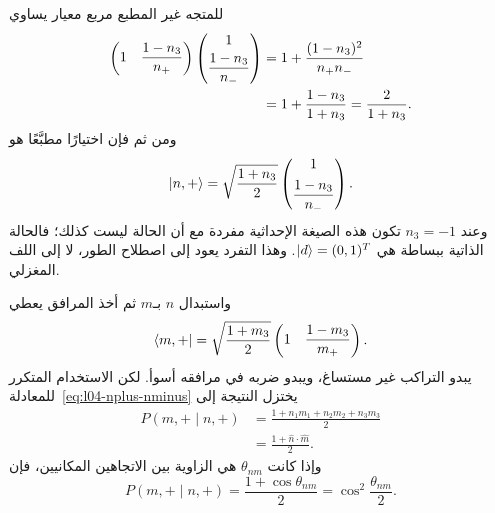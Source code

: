للمتجه غير المطبع مربع معيار يساوي
\begin{align}
  \begin{pmatrix}
    1&\dfrac{1-n_3}{n_+}
  \end{pmatrix}
  \begin{pmatrix}
    1\\[3pt]\dfrac{1-n_3}{n_-}
  \end{pmatrix}
  &=
  1+\frac{(1-n_3)^2}{n_+n_-}
  \notag\\
  &=
  1+\frac{1-n_3}{1+n_3}
  =
  \frac{2}{1+n_3}.
  \label{eq:l04-unnormalized-norm}
\end{align}
ومن ثم فإن اختيارًا مطبَّعًا هو
\begin{equation}
  \left\lvert n,+\right\rangle
  =
  \sqrt{\frac{1+n_3}{2}}
  \begin{pmatrix}
    1\\[5pt]\dfrac{1-n_3}{n_-}
  \end{pmatrix}.
  \label{eq:l04-normalized-n-state}
\end{equation}
وعند \(n_3=-1\) تكون هذه الصيغة الإحداثية مفردة مع أن الحالة ليست كذلك؛ فالحالة الذاتية ببساطة هي \(\left\lvert d\right\rangle=(0,1)^T\). وهذا التفرد يعود إلى اصطلاح الطور، لا إلى اللف المغزلي.

واستبدال \(n\) بـ\(m\) ثم أخذ المرافق يعطي
\begin{equation}
  \left\langle m,+\right\rvert
  =
  \sqrt{\frac{1+m_3}{2}}
  \begin{pmatrix}
    1&
    \dfrac{1-m_3}{m_+}
  \end{pmatrix}.
\end{equation}
يبدو التراكب غير مستساغ، ويبدو ضربه في مرافقه أسوأ. لكن الاستخدام المتكرر للمعادلة~\eqref{eq:l04-nplus-nminus} يختزل النتيجة إلى
\begin{equation}
  \begin{aligned}
    P(m,+\mid n,+)
    &=\frac{1+n_1m_1+n_2m_2+n_3m_3}{2}\\
    &=\frac{1+\hat n\cdot\hat m}{2}.
  \end{aligned}
  \label{eq:l04-spin-transition-probability}
\end{equation}
وإذا كانت \(\theta_{nm}\) هي الزاوية بين الاتجاهين المكانيين، فإن
\begin{equation}
  P(m,+\mid n,+)
  =
  \frac{1+\cos\theta_{nm}}{2}
  =
  \cos^2\frac{\theta_{nm}}{2}.
  \label{eq:l04-half-angle-probability}
\end{equation}

\begin{classroomqa}
\end{classroomqa}

